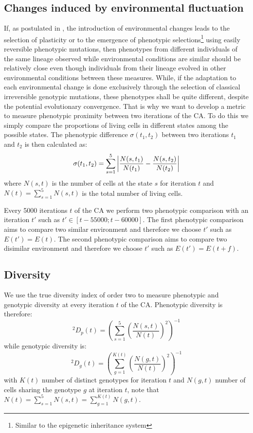 \subsection{Changes induced by environmental fluctuation}
If, as postulated in \citep{jablonka2014evolution}, the introduction of environmental changes leads to the selection of plasticity or to the emergence of phenotypic selections\footnote{Similar to the epigenetic inheritance system} using easily reversible phenotypic mutations, then phenotypes from different individuals of the same lineage observed while environmental conditions are similar should be relatively close even though individuals from their lineage evolved in other environmental conditions between these measures. While, if the adaptation to each environmental change is done exclusively through the selection of classical irreversible genotypic mutations, these phenotypes shall be quite different, despite the potential evolutionary convergence. That is why we want to develop a metric to measure phenotypic proximity between two iterations of the CA. To do this we simply compare the proportions of living cells in different states among the possible states. The phenotypic difference $\sigma(t_1,t_2)$ between two iterations $t_1$ and $t_2$ is then calculated as:
$$\sigma(t_1,t_2) = \sum_{s=1}^5 \left| \frac{N(s,t_1)}{N(t_1)}-\frac{N(s,t_2)}{N(t_2)}\right|$$ where $N(s,t)$ is the number of cells at the state $s$ for iteration $t$ and $N(t)=\sum_{s=1}^5 N(s,t)$ is the total number of living cells.

Every 5000 iterations $t$ of the CA we perform two phenotypic comparison with an iteration $t'$ such as $t'\in[t-55000;t-60000]$. The first phenotypic comparison aims to compare two similar environment and therefore we choose $t'$ such as $E(t')=E(t)$. The second phenotypic comparison aims to compare two disimilar environment and therefore we choose $t'$ such as $E(t')=E(t+f)$.  

\subsection{Diversity}
We use the true diversity index of order two to measure phenotypic and genotypic diversity at every iteration $t$ of the CA. Phenotypic diversity is therefore: $$^2D_p(t)=\left(\sum_{s=1}^5 \left(\frac{N(s,t)}{N(t)}\right)^2\right)^{-1}$$ while genotypic diversity is: $$^2D_g(t)=\left(\sum_{g=1}^{K(t)} \left(\frac{N(g,t)}{N(t)}\right)^2\right)^{-1}$$ with $K(t)$ number of distinct genotypes for iteration $t$ and $N(g,t)$ number of cells sharing the genotype $g$ at iteration $t$, note that $N(t)=\sum_{s=1}^5 N(s,t)=\sum_{g=1}^{K(t)} N(g,t)$.

